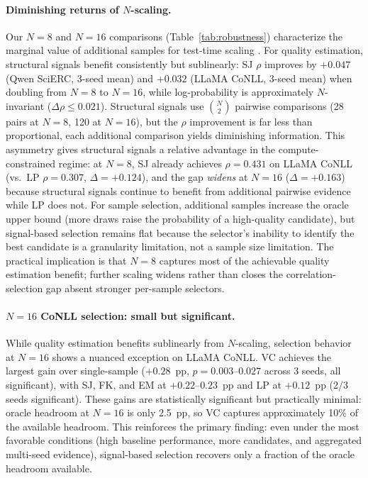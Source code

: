 \paragraph{Diminishing returns of $N$-scaling.}
Our $N{=}8$ and $N{=}16$ comparisons (Table~\ref{tab:robustness}) characterize the marginal value of additional samples for test-time scaling \cite{brown2024monkeys, snell2025scaling}.
For quality estimation, structural signals benefit consistently but sublinearly: SJ $\rho$ improves by $+0.047$ (Qwen SciERC, 3-seed mean) and $+0.032$ (LLaMA CoNLL, 3-seed mean) when doubling from $N{=}8$ to $N{=}16$, while log-probability is approximately $N$-invariant ($\Delta\rho{\leq}0.021$).
Structural signals use $\binom{N}{2}$ pairwise comparisons (28 pairs at $N{=}8$, 120 at $N{=}16$), but the $\rho$ improvement is far less than proportional, each additional comparison yields diminishing information.
This asymmetry gives structural signals a relative advantage in the compute-constrained regime: at $N{=}8$, SJ already achieves $\rho{=}0.431$ on LLaMA CoNLL (vs.\ LP $\rho{=}0.307$, $\Delta{=}{+}0.124$), and the gap \textit{widens} at $N{=}16$ ($\Delta{=}{+}0.163$) because structural signals continue to benefit from additional pairwise evidence while LP does not.
For sample selection, additional samples increase the oracle upper bound (more draws raise the probability of a high-quality candidate), but signal-based selection remains flat because the selector's inability to identify the best candidate is a granularity limitation, not a sample size limitation.
The practical implication is that $N{=}8$ captures most of the achievable quality estimation benefit; further scaling widens rather than closes the correlation-selection gap absent stronger per-sample selectors.

\paragraph{$N{=}16$ CoNLL selection: small but significant.}
While quality estimation benefits sublinearly from $N$-scaling, selection behavior at $N{=}16$ shows a nuanced exception on LLaMA CoNLL.
VC achieves the largest gain over single-sample ($+0.28$~pp, $p{=}0.003$--$0.027$ across 3 seeds, all significant), with SJ, FK, and EM at $+0.22$--$0.23$~pp and LP at $+0.12$~pp (2/3 seeds significant).
These gains are statistically significant but practically minimal: oracle headroom at $N{=}16$ is only 2.5~pp, so VC captures approximately 10\% of the available headroom.
This reinforces the primary finding: even under the most favorable conditions (high baseline performance, more candidates, and aggregated multi-seed evidence), signal-based selection recovers only a fraction of the oracle headroom available.

